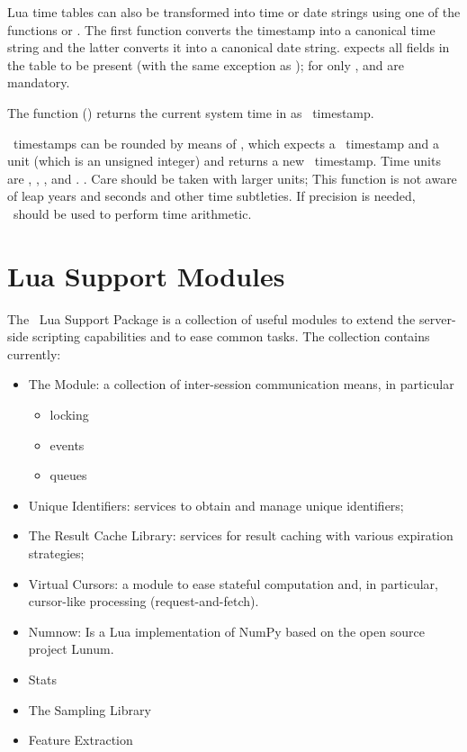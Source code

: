 Lua time tables can also be transformed into time or date
strings using one of the functions
 or
.
The first function converts the timestamp
into a canonical time string and the latter
converts it into a canonical date string.
 expects all fields in the
table to be present (with the same exception
as );
for  only ,
 and  are mandatory.

The function () returns
the current system time in 
as \nowdb\ timestamp.

\nowdb\ timestamps can be rounded by means of
, which expects a \nowdb\ time\-stamp
and a unit (which is an unsigned integer)
and returns a new \nowdb\ time\-stamp.
Time units are
,
,
,
 and
. .
Care should be taken with larger units;
This function is not aware of leap years and seconds
and other time subtleties. If precision is needed,
\sql\ should be used to perform time arithmetic.

\section{Lua Support Modules}\label{sec_luasupp}
The \nowdb\ Lua Support Package is a collection
of useful modules to extend the server-side
scripting capabilities and to ease common tasks.
The collection contains currently:

\begin{itemize}
\item The  Module:
      a collection of inter-session
      communication means, in particular
      \begin{itemize} 
      \item locking
      \item events
      \item queues
      \end{itemize} 
\item Unique Identifiers:
      services to obtain and manage unique identifiers;

\item The Result Cache Library:
      services for result caching with various
      expiration strategies;

\item Virtual Cursors:
      a module to ease stateful computation and,
      in particular, cursor-like processing (request-and-fetch).
       
\item Numnow:
      Is a Lua implementation of NumPy
      based on the open source project Lunum.
\item Stats
\item The Sampling Library
\item Feature Extraction
\end{itemize}


